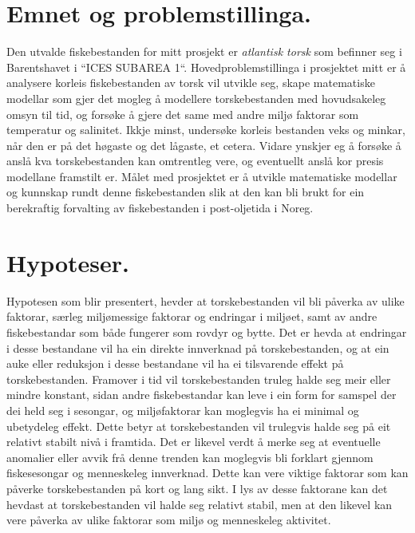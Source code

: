 \documentclass{report}
\begin{document}
\section{Emnet og problemstillinga.}
Den utvalde fiskebestanden for mitt prosjekt er \textit{atlantisk torsk} som befinner seg i Barentshavet i ``ICES SUBAREA 1``.
Hovedproblemstillinga i prosjektet mitt er å analysere korleis fiskebestanden av torsk vil utvikle seg, skape matematiske modellar som gjer det mogleg å modellere torskebestanden med hovudsakeleg omsyn til tid, og forsøke å gjere det same med andre miljø faktorar som temperatur og salinitet.
Ikkje minst, undersøke korleis bestanden veks og minkar, når den er på det høgaste og det lågaste, et cetera.
Vidare ynskjer eg å forsøke å anslå kva torskebestanden kan omtrentleg vere, og eventuellt anslå kor presis modellane framstilt er.
Målet med prosjektet er å utvikle matematiske modellar og kunnskap rundt denne fiskebestanden slik at den kan bli brukt for ein berekraftig forvalting av fiskebestanden i post-oljetida i Noreg.
\section{Hypoteser.}
Hypotesen som blir presentert, hevder at torskebestanden vil bli påverka av ulike faktorar, særleg miljømessige faktorar og endringar i miljøet, samt av andre fiskebestandar som både fungerer som rovdyr og bytte. Det er hevda at endringar i desse bestandane vil ha ein direkte innverknad på torskebestanden, og at ein auke eller reduksjon i desse bestandane vil ha ei tilsvarende effekt på torskebestanden.
Framover i tid vil torskebestanden truleg halde seg meir eller mindre konstant, sidan andre fiskebestandar kan leve i ein form for samspel der dei held seg i sesongar, og miljøfaktorar kan moglegvis ha ei minimal og ubetydeleg effekt. Dette betyr at torskebestanden vil trulegvis halde seg på eit relativt stabilt nivå i framtida.
Det er likevel verdt å merke seg at eventuelle anomalier eller avvik frå denne trenden kan moglegvis bli forklart gjennom fiskesesongar og menneskeleg innverknad. Dette kan vere viktige faktorar som kan påverke torskebestanden på kort og lang sikt.
I lys av desse faktorane kan det hevdast at torskebestanden vil halde seg relativt stabil, men at den likevel kan vere påverka av ulike faktorar som miljø og menneskeleg aktivitet.
\end{document}
